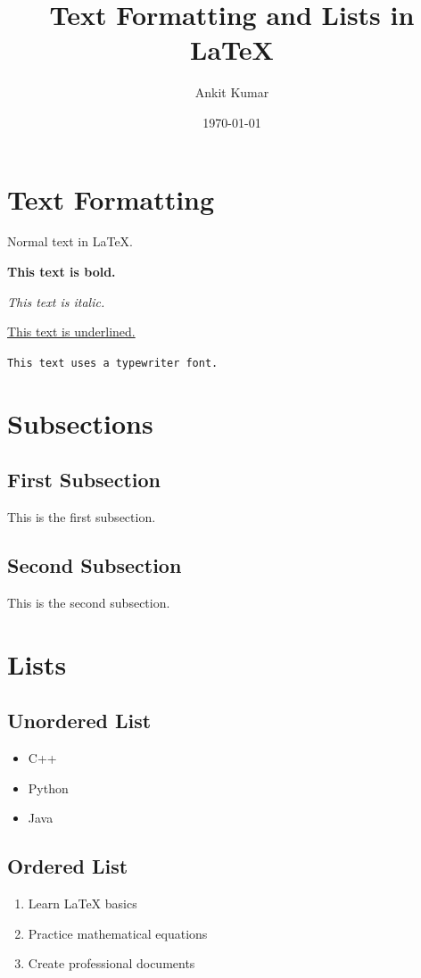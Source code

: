 \documentclass{article}
\title{Text Formatting and Lists in LaTeX}
\author{Ankit Kumar}
\date{\today}
\begin{document}
\maketitle

\section{Text Formatting}

Normal text in LaTeX.

\textbf{This text is bold.}

\textit{This text is italic.}

\underline{This text is underlined.}

\texttt{This text uses a typewriter font.}

\section{Subsections}

\subsection{First Subsection}
This is the first subsection.

\subsection{Second Subsection}
This is the second subsection.

\section{Lists}

\subsection{Unordered List}

\begin{itemize}
    \item C++
    \item Python
    \item Java
\end{itemize}

\subsection{Ordered List}

\begin{enumerate}
    \item Learn LaTeX basics
    \item Practice mathematical equations
    \item Create professional documents
\end{enumerate}
\end{document}
